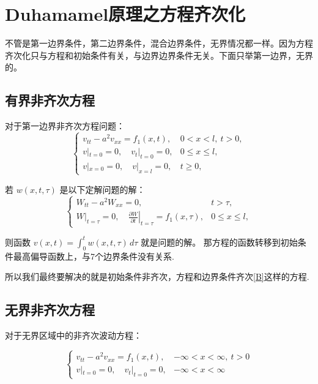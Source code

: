 \documentclass[12pt,a4paper]{article}
\numberwithin{subsection}{section}   %
\numberwithin{subsubsection}{subsection}
\theoremstyle{plain}
\theoremstyle{definition}
\theoremstyle{remark}
\theoremstyle{remark}
\begin{document}
	
	
		\newpage
	\section{Duhamamel原理之方程齐次化}
不管是第一边界条件，第二边界条件，混合边界条件，无界情况都一样。因为方程齐次化只与方程和初始条件有关，与边界边界条件无关。下面只举第一边界，无界的。
	
	
		\subsection{有界非齐次方程}

		
	对于第一边界非齐次方程问题：
	\begin{equation}
		\begin{cases}
			v_{tt} - a^2 v_{xx} = f_1(x, t), & 0 < x < l, \ t > 0, \\
			v|_{t=0} = 0, \quad v_t|_{t=0} = 0, & 0 \leq x \leq l, \\
			v|_{x=0} = 0, \quad v|_{x=l} = 0, & t \geq 0,
		\end{cases}
	\end{equation}
	
	若 \( w(x, t, \tau) \) 是以下定解问题的解：
	\begin{equation}
		\begin{cases}
			W_{tt} - a^2 W_{xx} = 0, & t > \tau, \\
			W|_{t=\tau} = 0, \quad \left. \frac{\partial W}{\partial t} \right|_{t=\tau} = f_1(x, \tau), & 0 \leq x \leq l,
		\end{cases}
	\end{equation}
	
	则函数 \( v(x, t) = \int_0^t w(x, t, \tau) \, d\tau \) 就是问题的解。
	那方程的函数转移到初始条件最高偏导函数上，与7个边界条件没有关系.

所以我们最终要解决的就是初始条件非齐次，方程和边界条件齐次\eqref{B}这样的方程.
	
	
	

	\subsection{无界非齐次方程}
	对于无界区域中的非齐次波动方程：
	
\begin{equation}
	\begin{cases}
		v_{tt} - a^2 v_{xx} = f_1(x, t), & -\infty < x < \infty, \ t > 0 \\
		v|_{t=0} = 0, \quad v_t|_{t=0} = 0, & -\infty < x < \infty
	\end{cases}
\end{equation}
	
\end{document}

